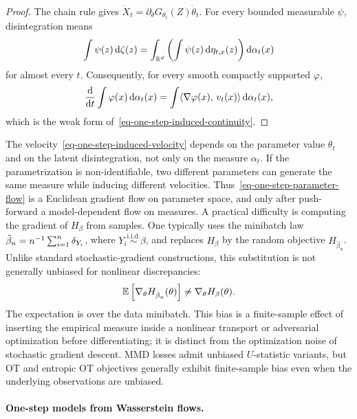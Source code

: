 \begin{proof}
	The chain rule gives $\dot X_t=\partial_\theta G_{\theta_t}(Z)\dot\theta_t$. For every bounded measurable $\psi$, disintegration means
	\[
		\int \psi(z)\,\mathrm{d}\zeta(z)=\int_{\mathbb{R}^d}\left(\int \psi(z)\,\mathrm{d}\eta_{t,x}(z)\right)\mathrm{d}\alpha_t(x)
	\]
	for almost every $t$. Consequently, for every smooth compactly supported $\varphi$,
	\[
		\frac{\mathrm{d}}{\mathrm{d} t}\int \varphi(x)\,\mathrm{d}\alpha_t(x)
		=
		\int \langle \nabla\varphi(x),\,v_t(x)\rangle\,\mathrm{d}\alpha_t(x),
	\]
	which is the weak form of~\eqref{eq-one-step-induced-continuity}.
\end{proof}

The velocity~\eqref{eq-one-step-induced-velocity} depends on the parameter value $\theta_t$ and on the latent disintegration, not only on the measure $\alpha_t$. If the parametrization is non-identifiable, two different parameters can generate the same measure while inducing different velocities. Thus~\eqref{eq-one-step-parameter-flow} is a Euclidean gradient flow on parameter space, and only after push-forward a model-dependent flow on measures.
A practical difficulty is computing the gradient of $H_\beta$ from samples. One typically uses the minibatch law $\hat\beta_n=n^{-1}\sum_{i=1}^n\delta_{Y_i}$, where $Y_i\overset{\mathrm{i.i.d.}}{\sim}\beta$, and replaces $H_\beta$ by the random objective $H_{\hat\beta_n}$. Unlike standard stochastic-gradient constructions, this substitution is not generally unbiased for nonlinear discrepancies:
\[
	\mathbb{E}\left[\nabla_\theta H_{\hat\beta_n}(\theta)\right]
	\neq
	\nabla_\theta H_\beta(\theta).
\]
The expectation is over the data minibatch. This bias is a finite-sample effect of inserting the empirical measure inside a nonlinear transport or adversarial optimization before differentiating; it is distinct from the optimization noise of stochastic gradient descent. MMD losses admit unbiased $U$-statistic variants, but OT and entropic OT objectives generally exhibit finite-sample bias even when the underlying observations are unbiased.

\paragraph{One-step models from Wasserstein flows.}

